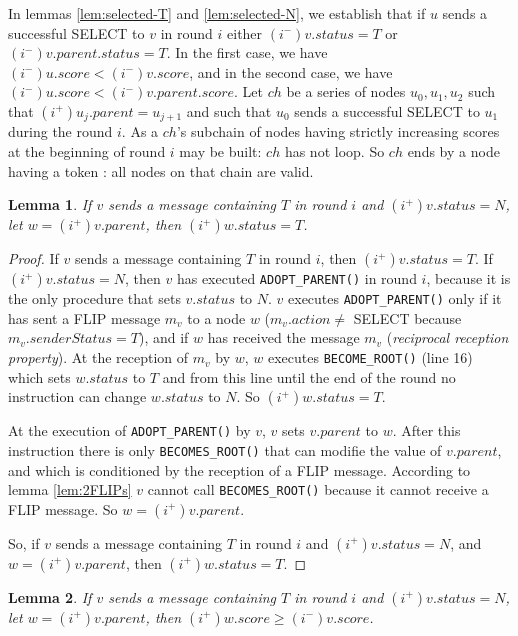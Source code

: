 \documentclass[twocolumn]{article}
\newtheorem{lemma}{Lemma}
\newcommand{\depends}[1]{}
\newcommand{\state}[3]{\ensuremath{(#2^{#3})#1}}
\newcommand{\uim}{\state{u}{i}{-}}
\newcommand{\vim}{\state{v}{i}{-}}
\newcommand{\vip}{\state{v}{i}{+}}
\newcommand{\wip}{\state{w}{i}{+}}
\begin{document}
In lemmas \ref{lem:selected-T} and  \ref{lem:selected-N}, we establish that
if $u$ sends a successful SELECT to $v$ in round $i$ either $\vim.status= T$ or $(i^-)v.parent.status= T$. In the first case, we have $\uim.score < \vim.score$, and in the second case, 
we have $\uim.score < (i^-)v.parent.score$.
Let $ch$ be a series of nodes $u_0, u_1, u_2$ such that $(i^+)u_j.parent=u_{j+1}$  
and such that $u_0$ sends a successful SELECT to $u_1$ during the round $i$.
As a $ch$'s subchain of nodes having strictly increasing scores at the beginning of round $i$ 
may be built: $ch$ has not loop. So $ch$ ends by a node having a token : all nodes on that chain are valid.







\begin{lemma}
  \label{lem:send-T-become-N-parent-T}
  If $v$ sends a message containing $T$ in round $i$ and $\vip.status=N$, let $w=\vip.parent$, then $\wip.status=T$.
\end{lemma}

\begin{proof}
If $v$ sends a message containing $T$ in round $i$, then $\vip.status=T$. If $\vip.status=N$, then $v$ has executed \texttt{ADOPT\_PARENT()} in round $i$, because it is the only procedure that sets $v.status$ to $N$.
$v$ executes \texttt{ADOPT\_PARENT()} only if it has sent a FLIP message $m_v$ to a node $w$ ($m_v.action \neq$ SELECT because $m_v.senderStatus=T$), and if $w$ has received the message $m_v$ (\textit{reciprocal reception property}). At the reception of $m_v$ by $w$, $w$ executes \texttt{BECOME\_ROOT()} (line 16) which sets $w.status$ to $T$ and from this line until the end of the round no instruction can change $w.status$ to $N$. So $\wip.status=T$.


At the execution of \texttt{ADOPT\_PARENT()} by $v$, $v$ sets $v.parent$ to $w$. After this instruction there is only \texttt{BECOMES\_ROOT()} that can modifie the value of $v.parent$, and which is conditioned by the reception of a FLIP message. According to lemma \ref{lem:2FLIPs} $v$ cannot call \texttt{BECOMES\_ROOT()} because it cannot receive a FLIP message. So $w=\vip.parent$.

So, if $v$ sends a message containing $T$ in round $i$ and $\vip.status=N$, and $w=\vip.parent$, then $\wip.status=T$.
 \end{proof}

\begin{lemma}
\label{lem:sendT}
If $v$ sends a message containing $T$
in round $i$ and $\vip.status=N$, let $w=\vip.parent$, then $\wip.score \ge \vim.score$.
\depends{\ref{lem:received-FLIP}, \ref{lem:T-if-T}}
\end{lemma}
\end{document}
